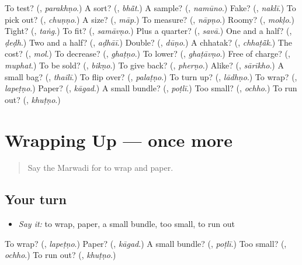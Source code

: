 \begin{tcolorbox}[breakable,colback=teal!4,colframe=teal!35!black,title={Before you move on}]
To test? (\textbf{}, \emph{parakhṇo}.) A sort? (\textbf{}, \emph{bhā̃t}.) A sample? (\textbf{}, \emph{namūno}.) Fake? (\textbf{}, \emph{naklī}.) To pick out? (\textbf{}, \emph{chuṇṇo}.) A size? (\textbf{}, \emph{māp}.) To measure? (\textbf{}, \emph{nāpṇo}.) Roomy? (\textbf{}, \emph{mokḷo}.) Tight? (\textbf{}, \emph{taṅg}.) To fit? (\textbf{}, \emph{samāvṇo}.) Plus a quarter? (\textbf{}, \emph{savā}.) One and a half? (\textbf{}, \emph{ḍeḍh}.) Two and a half? (\textbf{}, \emph{aḍhāī}.) Double? (\textbf{}, \emph{dūṇo}.) A chhatak? (\textbf{}, \emph{chhaṭā̃k}.) The cost? (\textbf{}, \emph{mol}.) To decrease? (\textbf{}, \emph{ghaṭṇo}.) To lower? (\textbf{}, \emph{ghaṭāvṇo}.) Free of charge? (\textbf{}, \emph{muphat}.) To be sold? (\textbf{}, \emph{bikṇo}.) To give back? (\textbf{}, \emph{pherṇo}.) Alike? (\textbf{}, \emph{sārīkho}.) A small bag? (\textbf{}, \emph{thailī}.) To flip over? (\textbf{}, \emph{palaṭṇo}.) To turn up? (\textbf{}, \emph{lādhṇo}.) To wrap? (\textbf{}, \emph{lapeṭṇo}.) Paper? (\textbf{}, \emph{kāgad}.) A small bundle? (\textbf{}, \emph{poṭlī}.) Too small? (\textbf{}, \emph{ochho}.) To run out? (\textbf{}, \emph{khuṭṇo}.)
\end{tcolorbox}
\section[(dialogue)]{Wrapping Up — once more}

\label{lesson:MW-R215-review-final-215}



\begin{quote}
Say the Marwadi for to wrap and paper.
\end{quote}

\subsection*{Your turn}
\begin{itemize}
\raggedright
  \item \emph{Say it:} to wrap, paper, a small bundle, too small, to run out
\end{itemize}

\begin{tcolorbox}[breakable,colback=teal!4,colframe=teal!35!black,title={Before you move on}]
To wrap? (\textbf{}, \emph{lapeṭṇo}.) Paper? (\textbf{}, \emph{kāgad}.) A small bundle? (\textbf{}, \emph{poṭlī}.) Too small? (\textbf{}, \emph{ochho}.) To run out? (\textbf{}, \emph{khuṭṇo}.)
\end{tcolorbox}
